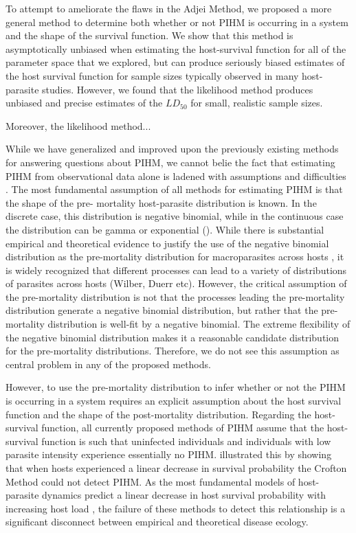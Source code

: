 \documentclass[12pt, a4paper]{article}
\begin{document}
To attempt to ameliorate the flaws in the Adjei Method, we proposed a more
general method to determine both whether or not PIHM is occurring in a system
and the shape of the survival function.  We show that this method is
asymptotically unbiased when estimating the host-survival function for all of
the parameter space that we explored, but can produce seriously biased
estimates of the host survival function for sample sizes typically observed in
many host-parasite studies.  However, we found that the likelihood method
produces unbiased and precise estimates of the $LD_{50}$ for small, realistic
sample sizes.

Moreover, the likelihood method...


While we have generalized and improved upon
the previously existing methods for answering questions about PIHM, we cannot belie the fact
that estimating PIHM from observational data alone is
ladened with assumptions and difficulties \citep{McCallum2000a}. The most fundamental
assumption of all methods for estimating PIHM is that the shape of the pre-
mortality host-parasite distribution is known. In the discrete case, this
distribution is negative binomial, while in the continuous case the distribution can be gamma or exponential (\citep{Ferguson2011}).  While there is substantial empirical and
theoretical evidence to justify the use of the negative binomial distribution
as the pre-mortality distribution for macroparasites across hosts \citep{Calabrese2011,Anderson1982a,Shaw1998}, it is widely recognized that different processes can lead to a variety of distributions of parasites across hosts (Wilber, Duerr etc).  However, the critical assumption of the pre-mortality distribution is not that the processes leading the pre-mortality distribution generate a negative binomial distribution, but rather that the pre-mortality distribution is well-fit by a negative binomial. The extreme flexibility of the negative binomial distribution makes it a reasonable candidate distribution for the pre-mortality distributions.  Therefore, we do not see this assumption as central problem in any of the proposed methods.

However, to use the pre-mortality distribution to infer whether or not the PIHM
is occurring in a system requires an explicit assumption about the host
survival function and the shape of the post-mortality distribution.  Regarding
the host-survival function, all currently proposed methods of PIHM assume that the host-survival
function is such that uninfected individuals and individuals with low parasite
intensity experience essentially no PIHM.  \cite{Lanciani1989} illustrated this
by showing that when hosts experienced a linear decrease in survival
probability the Crofton Method could not detect PIHM.  As the most fundamental models of host-parasite dynamics predict a linear decrease in host survival probability with increasing host load \citep{AndersonandMay1978}, the failure of these methods to detect this relationship is a significant disconnect between empirical and theoretical disease ecology.
\end{document}
